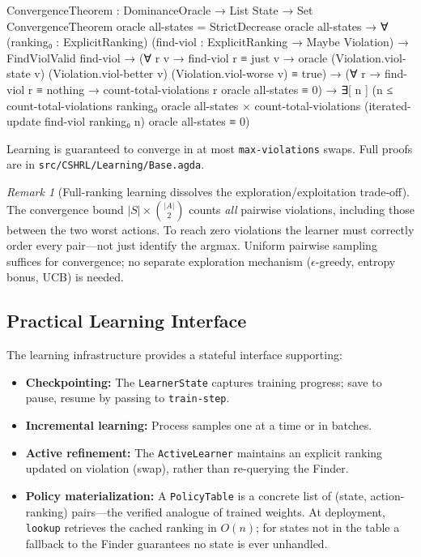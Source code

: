 \documentclass[9pt,a4paper]{article}
\newcommand{\fpath}[1]{\nolinkurl{#1}}
\theoremstyle{plain}
\theoremstyle{definition}
\theoremstyle{remark}
\newtheorem{remark}{Remark}
\begin{document}
\begin{code}
  ConvergenceTheorem : DominanceOracle → List State → Set
  ConvergenceTheorem oracle all-states = 
    StrictDecrease oracle all-states →
    ∀ (ranking₀ : ExplicitRanking) 
      (find-viol : ExplicitRanking → Maybe Violation) →
    FindViolValid find-viol →
    (∀ r v → find-viol r ≡ just v → 
       oracle (Violation.viol-state v) (Violation.viol-better v) 
              (Violation.viol-worse v) ≡ true) →
    (∀ r → find-viol r ≡ nothing → 
       count-total-violations r oracle all-states ≡ 0) →
    ∃[ n ] (n ≤ count-total-violations ranking₀ oracle all-states × 
            count-total-violations (iterated-update find-viol ranking₀ n) 
              oracle all-states ≡ 0)
\end{code}

\noindent Learning is guaranteed to converge in at most \texttt{max-violations} swaps.  Full proofs are in \fpath{src/CSHRL/Learning/Base.agda}.

\begin{remark}[Full-ranking learning dissolves the exploration/exploitation trade-off]\label{rem:exploration}
The convergence bound $|S| \times \binom{|A|}{2}$ counts \emph{all} pairwise violations, including those between the two worst actions.  To reach zero violations the learner must correctly order every pair---not just identify the argmax.  Uniform pairwise sampling suffices for convergence; no separate exploration mechanism ($\epsilon$-greedy, entropy bonus, UCB) is needed.
\end{remark}

\subsection{Practical Learning Interface}

The learning infrastructure provides a stateful interface supporting:

\begin{itemize}
\item \textbf{Checkpointing:} The \texttt{LearnerState} captures training progress; save to pause, resume by passing to \texttt{train-step}.
\item \textbf{Incremental learning:} Process samples one at a time or in batches.
\item \textbf{Active refinement:} The \texttt{ActiveLearner} maintains an explicit ranking updated on violation (swap), rather than re-querying the Finder.
\item \textbf{Policy materialization:} A \texttt{PolicyTable} is a concrete list of (state, action-ranking) pairs---the verified analogue of trained weights.  At deployment, \texttt{lookup} retrieves the cached ranking in $O(n)$; for states not in the table a fallback to the Finder guarantees no state is ever unhandled.
\end{itemize}
\end{document}
